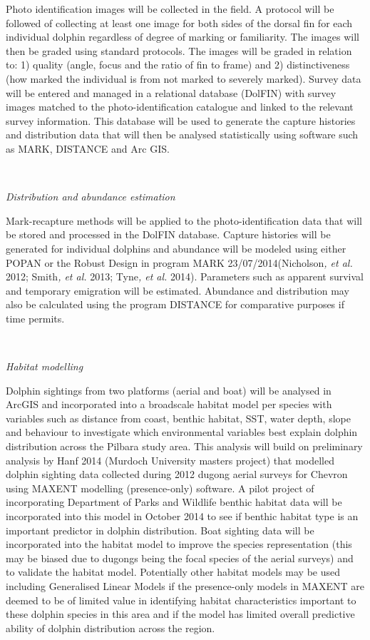 \documentclass[version=last,
    paper=a4,                               %
    10pt,                                   %
    dvipsnames,
    oneside,                              %
    headings=openany,                       %
    open=any,
    BCOR=7mm,                               %
    DIV=15,     %
]{scrbook}
\begin{document}
Photo identification images will be collected in the field. A protocol
will be followed of collecting at least one image for both sides of the
dorsal fin for each individual dolphin regardless of degree of marking
or familiarity. The images will then be graded using standard protocols.
The images will be graded in relation to: 1) quality (angle, focus and
the ratio of fin to frame) and 2) distinctiveness (how marked the
individual is from not marked to severely marked). Survey data will be
entered and managed in a relational database (DolFIN) with survey images
matched to the photo-identification catalogue and linked to the relevant
survey information. This database will be used to generate the capture
histories and distribution data that will then be analysed statistically
using software such as MARK, DISTANCE and Arc GIS.

\emph{~}

\emph{Distribution and abundance estimation}

Mark-recapture methods will be applied to the photo-identification data
that will be stored and processed in the DolFIN database. Capture
histories will be generated for individual dolphins and abundance will
be modeled using either POPAN or the Robust Design in program MARK
23/07/2014(Nicholson\emph{, et al.} 2012; Smith\emph{, et al.} 2013;
Tyne\emph{, et al.} 2014). Parameters such as apparent survival and
temporary emigration will be estimated. Abundance and distribution may
also be calculated using the program DISTANCE for comparative purposes
if time permits.

~

\emph{Habitat modelling}

Dolphin sightings from two platforms (aerial and boat) will be analysed
in ArcGIS and incorporated into a broadscale habitat model per species
with variables such as distance from coast, benthic habitat, SST, water
depth, slope and behaviour to investigate which environmental variables
best explain dolphin distribution across the Pilbara study area. This
analysis will build on preliminary analysis by Hanf 2014 (Murdoch
University masters project) that modelled dolphin sighting data
collected during 2012 dugong aerial surveys for Chevron using MAXENT
modelling (presence-only) software. A pilot project of incorporating
Department of Parks and Wildlife benthic habitat data will be
incorporated into this model in October 2014 to see if benthic habitat
type is an important predictor in dolphin distribution. Boat sighting
data will be incorporated into the habitat model to improve the species
representation (this may be biased due to dugongs being the focal
species of the aerial surveys) and to validate the habitat model.
Potentially other habitat models may be used including Generalised
Linear Models if the presence-only models in MAXENT are deemed to be of
limited value in identifying habitat characteristics important to these
dolphin species in this area and if the model has limited overall
predictive ability of dolphin distribution across the region.
\end{document}
